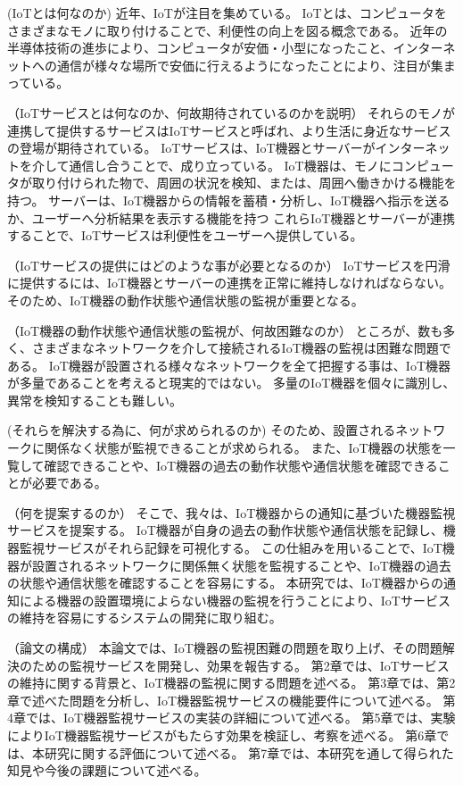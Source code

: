 
(IoTとは何なのか)
近年、IoTが注目を集めている。
IoTとは、コンピュータをさまざまなモノに取り付けることで、利便性の向上を図る概念である。
近年の半導体技術の進歩により、コンピュータが安価・小型になったこと、インターネットへの通信が様々な場所で安価に行えるようになったことにより、注目が集まっている。
\medskip

（IoTサービスとは何なのか、何故期待されているのかを説明）
それらのモノが連携して提供するサービスはIoTサービスと呼ばれ、より生活に身近なサービスの登場が期待されている。
IoTサービスは、IoT機器とサーバーがインターネットを介して通信し合うことで、成り立っている。
IoT機器は、モノにコンピュータが取り付けられた物で、周囲の状況を検知、または、周囲へ働きかける機能を持つ。
サーバーは、IoT機器からの情報を蓄積・分析し、IoT機器へ指示を送るか、ユーザーへ分析結果を表示する機能を持つ
これらIoT機器とサーバーが連携することで、IoTサービスは利便性をユーザーへ提供している。
\medskip

（IoTサービスの提供にはどのような事が必要となるのか）
IoTサービスを円滑に提供するには、IoT機器とサーバーの連携を正常に維持しなければならない。
そのため、IoT機器の動作状態や通信状態の監視が重要となる。
\medskip

（IoT機器の動作状態や通信状態の監視が、何故困難なのか）
ところが、数も多く、さまざまなネットワークを介して接続されるIoT機器の監視は困難な問題である。
IoT機器が設置される様々なネットワークを全て把握する事は、IoT機器が多量であることを考えると現実的ではない。
多量のIoT機器を個々に識別し、異常を検知することも難しい。
\medskip

(それらを解決する為に、何が求められるのか)
そのため、設置されるネットワークに関係なく状態が監視できることが求められる。
また、IoT機器の状態を一覧して確認できることや、IoT機器の過去の動作状態や通信状態を確認できることが必要である。
\medskip

（何を提案するのか）
そこで、我々は、IoT機器からの通知に基づいた機器監視サービスを提案する。
IoT機器が自身の過去の動作状態や通信状態を記録し、機器監視サービスがそれら記録を可視化する。
この仕組みを用いることで、IoT機器が設置されるネットワークに関係無く状態を監視することや、IoT機器の過去の状態や通信状態を確認することを容易にする。
本研究では、IoT機器からの通知による機器の設置環境によらない機器の監視を行うことにより、IoTサービスの維持を容易にするシステムの開発に取り組む。
\medskip

（論文の構成）
本論文では、IoT機器の監視困難の問題を取り上げ、その問題解決のための監視サービスを開発し、効果を報告する。
第2章では、IoTサービスの維持に関する背景と、IoT機器の監視に関する問題を述べる。
第3章では、第2章で述べた問題を分析し、IoT機器監視サービスの機能要件について述べる。
第4章では、IoT機器監視サービスの実装の詳細について述べる。
第5章では、実験によりIoT機器監視サービスがもたらす効果を検証し、考察を述べる。
第6章では、本研究に関する評価について述べる。
第7章では、本研究を通して得られた知見や今後の課題について述べる。


